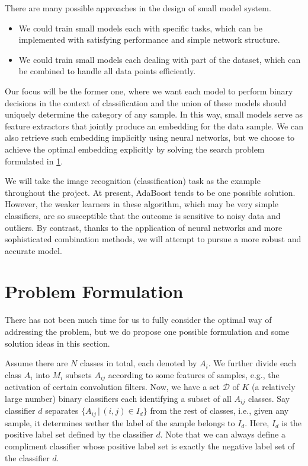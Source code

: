 \documentclass[acmsmall,nonacm]{acmart}\settopmatter{}
\begin{document}
There are many possible approaches in the design of small model system.
\begin{itemize}
  \item We could train small models each with specific tasks, which can be implemented with satisfying performance and simple network structure.
  \item We could train small models each dealing with part of the dataset, which can be combined to handle all data points efficiently.
\end{itemize}
Our focus will be the former one, where we want each model to perform binary decisions in the context of classification and the union of these models should uniquely determine the category of any sample.
In this way, small models serve as feature extractors that jointly produce an embedding for the data sample.
We can also retrieve such embedding implicitly using neural networks, but we choose to achieve the optimal embedding explicitly by solving the search problem formulated in \cref{sec:formulation}.

We will take the image recognition (classification) task as the example throughout the project.
At present, AdaBoost tends to be one possible solution.
However, the weaker learners in these algorithm, which may be very simple classifiers, are so susceptible that the outcome is sensitive to noisy data and outliers.
By contrast, thanks to the application of neural networks and more sophisticated combination methods, we will attempt to pursue a more robust and accurate model.

\section{Problem Formulation}
\label{sec:formulation}
There has not been much time for us to fully consider the optimal way of addressing the problem, but we do propose one possible formulation and some solution ideas in this section.

Assume there are $N$ classes in total, each denoted by $A_i$.
We further divide each class $A_i$ into $M_i$ subsets $A_{ij}$ according to some features of samples, e.g., the activation of certain convolution filters.
Now, we have a set $\mathcal{D}$ of $K$ (a relatively large number) binary classifiers each identifying a subset of all $A_{ij}$ classes.
Say classifier $d$ separates $\{A_{ij} \,|\, (i, j) \in I_d\}$ from the rest of classes, i.e., given any sample, it determines wether the label of the sample belongs to $I_d$.
Here, $I_d$ is the positive label set defined by the classifier $d$.
Note that we can always define a compliment classifier whose positive label set is exactly the negative label set of the classifier $d$.
\end{document}
